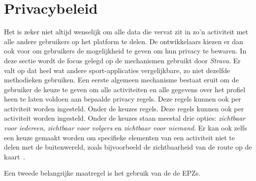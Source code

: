 \section{Privacybeleid}\label{sec:Algemene Privacy}
Het is zeker niet altijd wenselijk om alle data die vervat zit in zo'n
activiteit met alle andere gebruikers op het platform te delen. De
ontwikkelaars kiezen er dan ook voor om gebruikers de mogelijkheid te geven om
hun privacy te bewaren. In deze sectie wordt de focus gelegd op de mechanismen
gebruikt door \textit{Strava}. Er valt op dat heel wat andere sport-applicaties
vergelijkbare, zo niet dezelfde methodieken gebruiken. Een eerste algemeen
mechanisme bestaat eruit om de gebruiker de keuze te geven om alle activiteiten
en alle gegevens over het profiel heen te laten voldoen aan bepaalde privacy
regels. Deze regels kunnen ook per activiteit worden ingesteld. Onder de keuzes
regels. Deze regels kunnen ook per activiteit worden ingesteld. Onder de keuzes
staan meestal drie opties: \textit{zichtbaar voor iedereen}, \textit{zichtbaar
    voor volgers} en \textit{zichtbaar voor niemand}. Er kan ook zelfs een keuze
gemaakt worden om specifieke elementen van een activiteit niet te delen met de
buitenwereld, zoals bijvoorbeeld de zichtbaarheid van de route op de
kaart~\cite{Activity24:online}.

Een tweede belangrijke maatregel is het gebruik van de de \acp{EPZ}.

